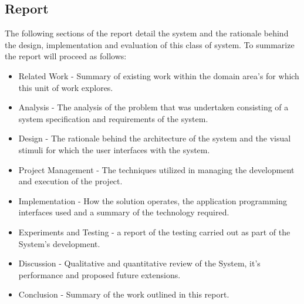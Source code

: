 \documentclass[11pt]{report}
\begin{document}
\subsection*{Report}
The following sections of the report detail the system and the rationale behind the design, implementation and evaluation of this class of system. To summarize the report will proceed as follows:

\begin{itemize}

\item Related Work - Summary of existing work within the domain area's for which this unit of work explores.

\item Analysis - The analysis of the problem that was undertaken consisting of a system specification and requirements of the system.

\item Design - The rationale behind the architecture of the system and the visual stimuli for which the user interfaces with the system.

\item Project Management - The techniques utilized in managing the development and execution of the project.

\item Implementation - How the solution operates, the application programming interfaces used and a summary of the technology required.

\item Experiments and Testing - a report of the testing carried out as part of the System's development.

\item Discussion - Qualitative and quantitative review of the System, it's performance and proposed future extensions.

\item Conclusion - Summary of the work outlined in this report.
\end{itemize}
\end{document}
